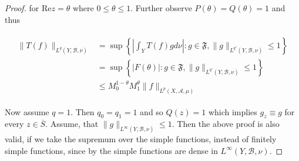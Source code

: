 \begin{proof}
		for $\mathrm{Re}z = \theta$ where $0 \leqslant \theta \leqslant 1$. Further observe $P(\theta) = Q(\theta) = 1$ and thus 
		
		\begin{gather}
			\begin{aligned}
				\|T(f)\|_{L^q(Y,\mathcal{B},\nu)} &= \sup\left\{\left\vert \int_Y T(f)gd\nu\right\vert : g \in \mathfrak{F}, \|g\|_{L^{q'}(Y,\mathcal{B},\nu)}\leqslant 1\right\}\\
				&=  \sup\left\{\left\vert F(\theta)\right\vert : g \in \mathfrak{F}, \|g\|_{L^{q'}(Y,\mathcal{B},\nu)} \leqslant 1\right\}\\
				&\leqslant M_0^{1 - \theta}M_1^\theta \|f\|_{L^p(X,\mathcal{A},\mu)}
				\label{id:F}
			\end{aligned}
		\end{gather}

		Now assume \underline{$q = 1$}. Then $q_0 = q_1 = 1$ and so $Q(z) = 1$ which implies $g_z \equiv g$ for every $z \in \overline{S}$. Assume, that $\|g\|_{L^\infty(Y,\mathcal{B},\nu)} \leqslant 1$. Then the above proof is also valid, if we take the supremum over the simple functions, instead of finitely simple functions, since by \cite[100]{cohn:measure_theory:2013} the simple functions are dense in $L^{\infty}(Y,\mathcal{B},\nu)$.		
\end{proof}
